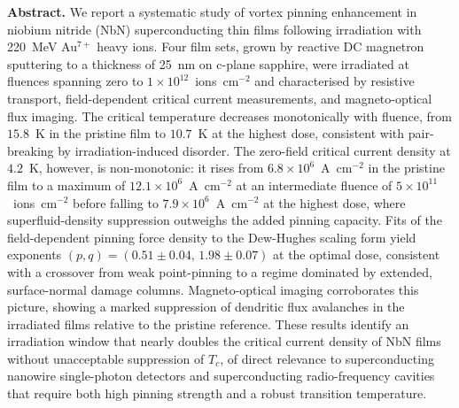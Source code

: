 \begin{abstractbox}
\textbf{\color{iopBlue}Abstract.} We report a systematic study of vortex pinning enhancement in niobium nitride (NbN) superconducting thin films following irradiation with 220~MeV Au$^{7+}$ heavy ions. Four film sets, grown by reactive DC magnetron sputtering to a thickness of 25~nm on c-plane sapphire, were irradiated at fluences spanning zero to $1\times10^{12}$~ions~cm$^{-2}$ and characterised by resistive transport, field-dependent critical current measurements, and magneto-optical flux imaging. The critical temperature decreases monotonically with fluence, from $15.8$~K in the pristine film to $10.7$~K at the highest dose, consistent with pair-breaking by irradiation-induced disorder. The zero-field critical current density at $4.2$~K, however, is non-monotonic: it rises from $6.8\times10^{6}$~A~cm$^{-2}$ in the pristine film to a maximum of $12.1\times10^{6}$~A~cm$^{-2}$ at an intermediate fluence of $5\times10^{11}$~ions~cm$^{-2}$ before falling to $7.9\times10^{6}$~A~cm$^{-2}$ at the highest dose, where superfluid-density suppression outweighs the added pinning capacity. Fits of the field-dependent pinning force density to the Dew-Hughes scaling form yield exponents $(p,q) = (0.51 \pm 0.04,\, 1.98\pm0.07)$ at the optimal dose, consistent with a crossover from weak point-pinning to a regime dominated by extended, surface-normal damage columns. Magneto-optical imaging corroborates this picture, showing a marked suppression of dendritic flux avalanches in the irradiated films relative to the pristine reference. These results identify an irradiation window that nearly doubles the critical current density of NbN films without unacceptable suppression of $T_c$, of direct relevance to superconducting nanowire single-photon detectors and superconducting radio-frequency cavities that require both high pinning strength and a robust transition temperature.
\end{abstractbox}
